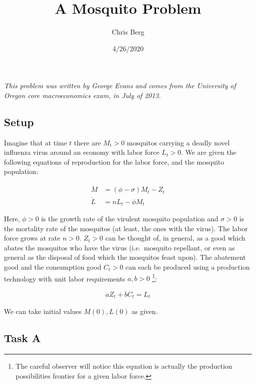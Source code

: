 \documentclass[
]{article}
\title{A Mosquito Problem}
\author{Chris Berg}
\date{4/26/2020}
\begin{document}
\maketitle

\emph{This problem was written by George Evans and comes from the
University of Oregon core macroeconomics exam, in July of 2013.}

\hypertarget{setup}{%
\subsection{Setup}\label{setup}}

Imagine that at time \(t\) there are \(M_t > 0\) mosquitos carrying a
deadly novel influenza virus around an economy with labor force
\(L_t > 0\). We are given the following equations of reproduction for
the labor force, and the mosquito population:

\begin{align}

\dot{M} &= (\phi - \sigma)M_t - Z_t \\
\dot{L} &= nL_t - \phi M_t

\end{align}

Here, \(\phi > 0\) is the growth rate of the virulent mosquito
population and \(\sigma > 0\) is the mortality rate of the mosquitos (at
least, the ones with the virus). The labor force grows at rate
\(n > 0\). \(Z_t > 0\) can be thought of, in general, as a good which
abates the mosquitos who have the virus (i.e.~mosquito repellant, or
even as general as the disposal of food which the mosquitos feast upon).
The abatement good and the consumption good \(C_t > 0\) can each be
produced using a production technology with unit labor requirements
\(a,b > 0\) \footnote{The careful observer will notice this equation is
  actually the production possibilities frontier for a given labor
  force.}:

\begin{align}

aZ_t + bC_t = L_t

\end{align}

We can take initial values \(M(0) , L(0)\) as given.

\hypertarget{task-a}{%
\subsection{Task A}\label{task-a}}
\end{document}
